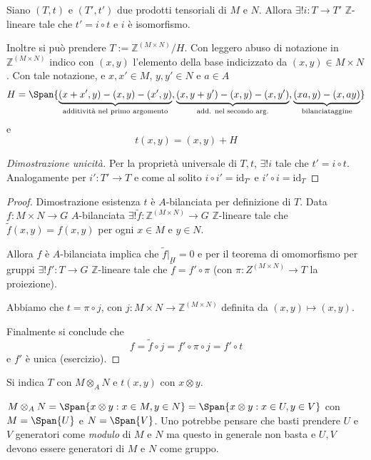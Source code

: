 \begin{proposition}{}
    Siano \({(T, t)}\) e \({(T', t')}\) due prodotti tensoriali di \(M\) e
    \(N\). Allora \(\exists ! i : T \to T'\) \(\mathbb{Z}\)-lineare tale che
    \(t' = i \circ t\) e \(i\) è isomorfismo.

    Inoltre si può prendere \(T := \mathbb{Z}^{{(M \times N)}} / H\). Con
    leggero abuso di notazione in \(\mathbb{Z}^{{(M \times  N)}}\) indico con
    \({(x, y)}\) l'elemento della base indicizzato da \({(x, y)} \in M \times
    N\). Con tale notazione, e \(x, x' \in M\), \(y, y' \in N\) e \(a \in A\) 
    \[
        H = \Span{\underbrace{{(x + x', y)} - {(x,y)} -
        {(x',y)}}_{\text{additività nel primo argomento}}, \underbrace{{(x, y +
y')} - {(x,y)} - {(x, y')}}_{\text{add. nel secondo arg.}}, \underbrace{{(xa,y)}
- {(x, ay)}}_{\text{bilanciataggine}}} 
    \]
    e 
    \[
      t{(x,y)} = {(x,y)} + H
    \]
\end{proposition}
\begin{proof}[Dimostrazione unicità]
    Per la proprietà universale di \(T, t\), \(\exists ! i \) tale che \(t' = i
    \circ t\). Analogamente per \(i' : T' \to T\) e come al solito \(i \circ i'
    = \mathrm{id}_{T'} \) e \(i' \circ i = \mathrm{id}_T\) 
\end{proof}
\begin{proof}{Dimostrazione esistenza}
    \(t\) è \(A\)-bilanciata per definizione di \(T\). Data \(f: M \times N \to
    G\) \(A\)-bilanciata \(\exists ! \tilde{f} : \mathbb{Z}^{{(M \times N)}} \to
    G\) \(\mathbb{Z}\)-lineare tale che \(\tilde{f}{(x, y)} = f{(x, y)}\) per
    ogni \(x \in M\) e \(y \in N\).

    Allora \(f\) è \(A\)-bilanciata implica che \(\tilde{f}|_H = 0\) e per il
    teorema di omomorfismo per gruppi \(\exists ! f' : T \to G\)
    \(\mathbb{Z}\)-lineare tale che \(\tilde{f} = f' \circ \pi\) (con \(\pi : Z
    ^{{(M \times N)}} \to T\) la proiezione).

    Abbiamo che \(t = \pi \circ j\), con \(j : M \times N \to \mathbb{Z}^{{(M \times
    N)}}\) definita da \({(x, y)} \mapsto {(x,y)}\).

    Finalmente si conclude che
    \[
      f = \tilde{f} \circ j = f' \circ \pi \circ j = f' \circ t
    \]
    e \(f'\) è unica (esercizio). %
\end{proof}

\begin{note}[zione]
    Si indica \(T\) con \(M \otimes_A N\) e \(t{(x,y)}\) con \(x \otimes y\).
\end{note}
\begin{remark}{}
    \(M \otimes_A N = \Span{x \otimes y : x \in M, y \in N} = \Span{x \otimes y
    : x \in U, y \in V} \) con \(M = \Span{U} \) e \(N = \Span{V} \). Uno
    potrebbe pensare che basti prendere \(U\) e \(V\) generatori come
    \emph{modulo} di \(M\) e \(N\) ma questo in generale non basta e \(U, V\)
    devono essere generatori di \(M\) e \(N\) come gruppo.
\end{remark}

